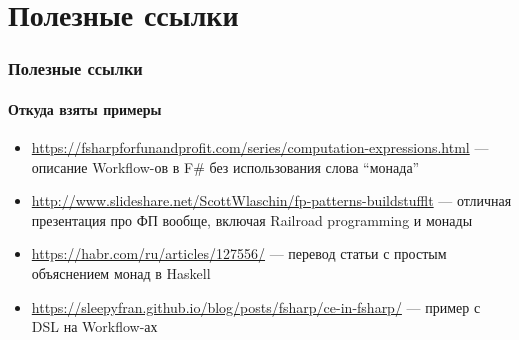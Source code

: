 \documentclass{../../slides-style}
\begin{document}
    \section{Полезные ссылки}

    \begin{frame}
        \frametitle{Полезные ссылки}
        \framesubtitle{Откуда взяты примеры}
        \begin{small}
            \begin{itemize}
                \item \url{https://fsharpforfunandprofit.com/series/computation-expressions.html} --- описание Workflow-ов в F\# без использования слова ``монада''
                \item \url{http://www.slideshare.net/ScottWlaschin/fp-patterns-buildstufflt} --- отличная презентация про ФП вообще, включая Railroad programming и монады
                \item \url{https://habr.com/ru/articles/127556/} --- перевод статьи с простым объяснением монад в Haskell
                \item \url{https://sleepyfran.github.io/blog/posts/fsharp/ce-in-fsharp/} --- пример с DSL на Workflow-ах
            \end{itemize}
        \end{small}
    \end{frame}
\end{document}
